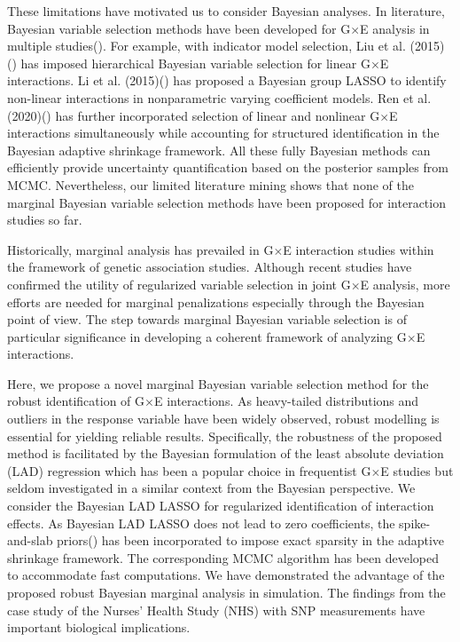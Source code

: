 \documentclass[12pt]{article}
\begin{document}
These limitations have motivated us to consider Bayesian analyses. In literature, Bayesian variable selection methods have been developed for G$\times$E analysis in multiple studies(\cite{ZFR}). For example, with indicator model selection, Liu et al. (2015) (\cite{LMA}) has imposed hierarchical Bayesian variable selection for linear G$\times$E interactions.  Li et al. (2015)(\cite{LWL}) has proposed a Bayesian group LASSO to identify non-linear interactions in nonparametric varying coefficient models. Ren et al. (2020)(\cite{RZL}) has further incorporated selection of linear and nonlinear G$\times$E interactions simultaneously while accounting for structured identification in the Bayesian adaptive shrinkage framework.  All these fully Bayesian methods can efficiently provide uncertainty quantification based on the posterior samples from MCMC. Nevertheless, our limited literature mining shows that none of the marginal Bayesian variable selection methods have been proposed for interaction studies so far. 

Historically, marginal analysis has prevailed in G$\times$E interaction studies within the framework of genetic association studies. Although recent studies have confirmed the utility of regularized variable selection in joint G$\times$E analysis, more efforts are needed for marginal penalizations especially through the Bayesian point of view. The step towards marginal Bayesian variable selection is of particular significance in developing a coherent framework of analyzing G$\times$E interactions.

Here, we propose a novel marginal Bayesian variable selection method for the robust identification of G$\times$E interactions. As heavy-tailed distributions and outliers in the response variable have been widely observed, robust modelling is essential for yielding reliable results. Specifically, the robustness of the proposed method is facilitated by the Bayesian formulation of the least absolute deviation (LAD) regression which has been a popular choice in frequentist G$\times$E studies but seldom investigated in a similar context from the Bayesian perspective. We consider the Bayesian LAD LASSO for regularized identification of interaction effects. As Bayesian LAD LASSO does not lead to zero coefficients, the spike-and-slab priors(\cite{GEMC, ISHW}) has been incorporated to impose exact sparsity in the adaptive shrinkage framework. The corresponding MCMC algorithm has been developed to accommodate fast computations. We have demonstrated the advantage of the proposed robust Bayesian marginal analysis in simulation. The findings from the case study of  the Nurses’ Health Study (NHS) with SNP measurements have important biological implications. 
\end{document}
